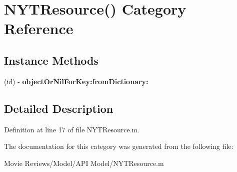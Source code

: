 \section{N\+Y\+T\+Resource() Category Reference}
\label{category_n_y_t_resource_07_08}
\subsection*{Instance Methods}
\begin{DoxyCompactItemize}
\item 
(id) -\/ {\bfseries object\+Or\+Nil\+For\+Key\+:from\+Dictionary\+:}\label{category_n_y_t_resource_07_08_a478ac4a46c448f34bd8873da936a7d79}

\end{DoxyCompactItemize}


\subsection{Detailed Description}


Definition at line 17 of file N\+Y\+T\+Resource.\+m.



The documentation for this category was generated from the following file\+:\begin{DoxyCompactItemize}
\item 
Movie Reviews/\+Model/\+A\+P\+I Model/N\+Y\+T\+Resource.\+m\end{DoxyCompactItemize}
